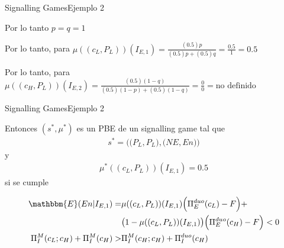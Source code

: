 \documentclass[notes, 11pt]{beamer} %
\newenvironment{wideitemize}{\itemize\addtolength{\itemsep}{10pt}}{\enditemize}
\begin{document}
\begin{frame}{Signalling Games}{Ejemplo 2}
	\begin{wideitemize}
		\item<1-> Por lo tanto $p=q=1$
		\item<2-> Por lo tanto, para $\mu( (c_{L}, P_{L}) )(I_{E,1}) = \frac{(0.5)p}{(0.5)p+ (0.5)q} = \frac{0.5}{1} = 0.5$
		\item<3-> Por lo tanto, para $\mu( (c_{H}, P_{L}) )(I_{E,2}) = \frac{(0.5)(1-q)}{(0.5)(1-p)+ (0.5)(1-q)} = \frac{0}{0} = \text{no definido}$
	\end{wideitemize}
\end{frame}

\begin{frame}{Signalling Games}{Ejemplo 2}
	\begin{wideitemize}
		\item<1-> Entonces $(s^{*},\mu^{*})$ es un PBE de un signalling game tal que
		\begin{align*}
			s^{*} = \Big( \big(P_{L},P_{L}\big), \big(NE,En\big) \Big)
		\end{align*} y 
		\begin{align*}
			\mu^{*}( (c_{L}, P_{L}) )(I_{E,1}) = 0.5
		\end{align*} si se cumple
		\begin{small}
		\begin{align*}
			\mathbbm{E}(En | I_{E,1}) = & \mu( (c_{L}, P_{L}) )(I_{E,1}) \Big( \Pi_{E}^{duo}(c_{L})-F \Big) + \\
			& \big( 1 - \mu( (c_{L}, P_{L}) )(I_{E,1}) \big) \Big( \Pi_{E}^{duo}(c_{H})-F \Big) < 0 \\
			\Pi_{I}^{M}(c_{L};c_{H}) + \Pi_{I}^{M}(c_{H}) >& \Pi_{I}^{M}(c_{H};c_{H}) + \Pi_{I}^{duo}(c_{H})
		\end{align*}
		\end{small}
	\end{wideitemize}
\end{frame}

\fi


\begin{frame}
\maketitle
\end{frame}
\end{document}
